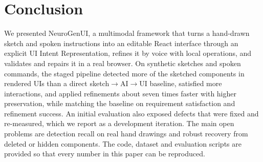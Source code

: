 \section{Conclusion}
We presented NeuroGenUI, a multimodal framework that turns a hand-drawn sketch and spoken instructions into an editable React interface through an explicit UI Intent Representation, refines it by voice with local operations, and validates and repairs it in a real browser. On \CountSketches{} synthetic sketches and \CountCommands{} spoken commands, the staged pipeline detected more of the sketched components in rendered UIs than a direct sketch$\rightarrow$AI$\rightarrow$UI baseline, satisfied more interactions, and applied refinements about seven times faster with higher preservation, while matching the baseline on requirement satisfaction and refinement success. An initial evaluation also exposed defects that were fixed and re-measured, which we report as a development iteration. The main open problems are detection recall on real hand drawings and robust recovery from deleted or hidden components. The code, dataset and evaluation scripts are provided so that every number in this paper can be reproduced.
